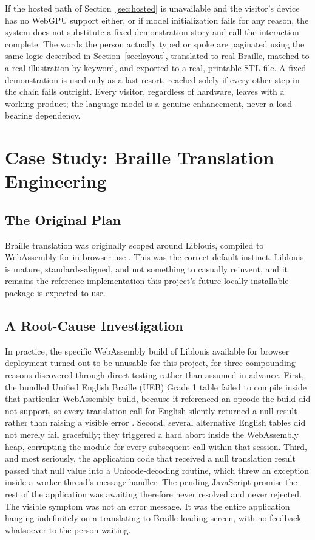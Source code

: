 \documentclass[conference]{IEEEtran}
\begin{document}
If the hosted path of Section~\ref{sec:hosted} is unavailable and the visitor's device has no WebGPU support either, or if model initialization fails for any reason, the system does not substitute a fixed demonstration story and call the interaction complete. The words the person actually typed or spoke are paginated using the same logic described in Section~\ref{sec:layout}, translated to real Braille, matched to a real illustration by keyword, and exported to a real, printable STL file. A fixed demonstration is used only as a last resort, reached solely if every other step in the chain fails outright. Every visitor, regardless of hardware, leaves with a working product; the language model is a genuine enhancement, never a load-bearing dependency.

\section{Case Study: Braille Translation Engineering}\label{sec:braille}

\subsection{The Original Plan}

Braille translation was originally scoped around Liblouis, compiled to WebAssembly for in-browser use \cite{liblouis}. This was the correct default instinct. Liblouis is mature, standards-aligned, and not something to casually reinvent, and it remains the reference implementation this project's future locally installable package is expected to use.

\subsection{A Root-Cause Investigation}

In practice, the specific WebAssembly build of Liblouis available for browser deployment turned out to be unusable for this project, for three compounding reasons discovered through direct testing rather than assumed in advance. First, the bundled Unified English Braille (UEB) Grade 1 table failed to compile inside that particular WebAssembly build, because it referenced an opcode the build did not support, so every translation call for English silently returned a null result rather than raising a visible error \cite{ueb}. Second, several alternative English tables did not merely fail gracefully; they triggered a hard abort inside the WebAssembly heap, corrupting the module for every subsequent call within that session. Third, and most seriously, the application code that received a null translation result passed that null value into a Unicode-decoding routine, which threw an exception inside a worker thread's message handler. The pending JavaScript promise the rest of the application was awaiting therefore never resolved and never rejected. The visible symptom was not an error message. It was the entire application hanging indefinitely on a translating-to-Braille loading screen, with no feedback whatsoever to the person waiting.
\end{document}
